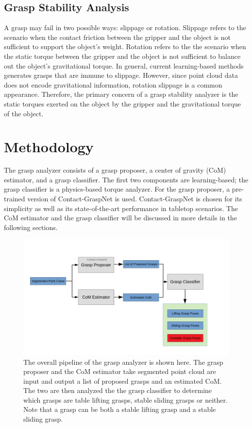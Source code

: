 \documentclass[12pt]{ucsddissertation}
\begin{document}
\section{Grasp Stability Analysis}
A grasp may fail in two possible ways: slippage or rotation. Slippage refers to the scenario when the contact friction between the gripper and the object is not sufficient to support the object's weight. Rotation refers to the the scenario when the static torque between the gripper and the object is not sufficient to balance out the object's gravitational torque. In general, current learning-based methods generates grasps that are immune to slippage. However, since point cloud data does not encode gravitational information, rotation slippage is a common appearance. Therefore, the primary concern of a grasp stability analyzer is the static torques exerted on the object by the gripper and the gravitational torque of the object.


\chapter{Methodology}
The grasp analyzer consists of a grasp proposer, a center of gravity (CoM) estimator, and a grasp classifier. The first two components are learning-based; the grasp classifier is a physics-based torque analyzer. For the grasp proposer, a pre-trained version of Contact-GraspNet \cite{Sundermeyer_Mousavian_Triebel_Fox_2021} is used. Contact-GraspNet is chosen for its simplicity as well as its state-of-the-art performance in tabletop scenarios. The CoM estimator and the grasp classifier will be discussed in more details in the following sections.

\begin{figure}
	\centering
	\includegraphics[width=\linewidth]{figures/overallPipeline.png}
	\caption[Overall Pipeline of the proposed grasp analyzer]{The overall pipeline of the grasp analyzer is shown here. The grasp proposer and the CoM estimator take segmented point cloud are input and output a list of proposed grasps and an estimated CoM. The two are then analyzed the the grasp classifier to determine which grasps are table lifting grasps, stable sliding grasps or neither. Note that a grasp can be both a stable lifting grasp and a stable sliding grasp.}
	\label{fig:overallPipeline}
\end{figure}
\end{document}
